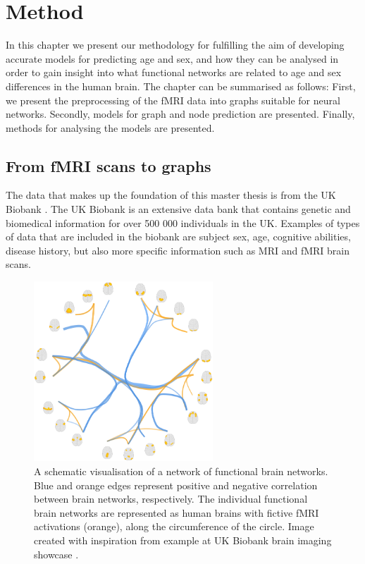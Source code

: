 \chapter{Method}

In this chapter we present our methodology for fulfilling the aim of developing accurate models for predicting age and sex, and how they can be analysed in order to gain insight into what functional networks are related to age and sex differences in the human brain. The chapter can be summarised as follows: First, we present the preprocessing of the fMRI data into graphs suitable for neural networks. Secondly, models for graph and node prediction are presented. Finally, methods for analysing the models are presented.

\section{From fMRI scans to graphs}\label{sec:fmri_to_graphs}
The data that makes up the foundation of this master thesis is from the UK Biobank \cite{ukbiobank}. The UK Biobank is an extensive data bank that contains genetic and biomedical information for over 500 000 individuals in the UK. Examples of types of data that are included in the biobank are subject sex, age, cognitive abilities, disease history, but also more specific information such as MRI and fMRI brain scans.

\begin{figure}[H]
    \centering
    \includegraphics[width=0.6\textwidth]{chapters/images_methods/fmri_network_redone.png}
    \caption{A schematic visualisation of a network of functional brain networks. Blue and orange edges represent positive and negative correlation between brain networks, respectively.  The individual functional brain networks are represented as human brains with fictive fMRI activations (orange), along the circumference of the circle. Image created with inspiration from example at UK Biobank brain imaging showcase  \cite{ukbiobank_brain_imaging}.}
    \label{fig:fmri_network}
\end{figure}

